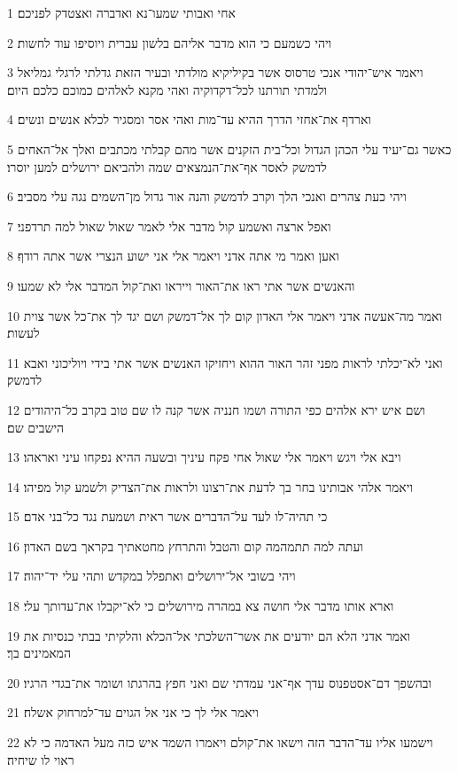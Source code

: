 \par 1 אחי ואבותי שמעו־נא ואדברה ואצטדק לפניכם׃
\par 2 ויהי כשמעם כי הוא מדבר אליהם בלשון עברית ויוסיפו עוד לחשות׃
\par 3 ויאמר איש־יהודי אנכי טרסוס אשר בקיליקיא מולדתי ובעיר הזאת גדלתי לרגלי גמליאל ולמדתי תורתנו לכל־דקדוקיה ואהי מקנא לאלהים כמוכם כלכם היום׃
\par 4 וארדף את־אחזי הדרך ההיא עד־מות ואהי אסר ומסגיר לכלא אנשים ונשים׃
\par 5 כאשר גם־יעיד עלי הכהן הגדול וכל־בית הזקנים אשר מהם קבלתי מכתבים ואלך אל־האחים לדמשק לאסר אף־את־הנמצאים שמה ולהביאם ירושלים למען יוסרו׃
\par 6 ויהי כעת צהרים ואנכי הלך וקרב לדמשק והנה אור גדול מן־השמים נגה עלי מסביב׃
\par 7 ואפל ארצה ואשמע קול מדבר אלי לאמר שאול שאול למה תרדפני׃
\par 8 ואען ואמר מי אתה אדני ויאמר אלי אני ישוע הנצרי אשר אתה רודף׃
\par 9 והאנשים אשר אתי ראו את־האור וייראו ואת־קול המדבר אלי לא שמעו׃
\par 10 ואמר מה־אעשה אדני ויאמר אלי האדון קום לך אל־דמשק ושם יגד לך את־כל אשר צוית לעשות׃
\par 11 ואני לא־יכלתי לראות מפני זהר האור ההוא ויחזיקו האנשים אשר אתי בידי ויוליכוני ואבא לדמשק׃
\par 12 ושם איש ירא אלהים כפי התורה ושמו חנניה אשר קנה לו שם טוב בקרב כל־היהודים הישבים שם׃
\par 13 ויבא אלי ויגש ויאמר אלי שאול אחי פקח עיניך ובשעה ההיא נפקחו עיני ואראהו׃
\par 14 ויאמר אלהי אבותינו בחר בך לדעת את־רצונו ולראות את־הצדיק ולשמע קול מפיהו׃
\par 15 כי תהיה־לו לעד על־הדברים אשר ראית ושמעת נגד כל־בני אדם׃
\par 16 ועתה למה תתמהמה קום והטבל והתרחץ מחטאתיך בקראך בשם האדון׃
\par 17 ויהי בשובי אל־ירושלים ואתפלל במקדש ותהי עלי יד־יהוה׃
\par 18 וארא אותו מדבר אלי חושה צא במהרה מירושלים כי לא־יקבלו את־עדותך עלי׃
\par 19 ואמר אדני הלא הם יודעים את אשר־השלכתי אל־הכלא והלקיתי בבתי כנסיות את המאמינים בך׃
\par 20 ובהשפך דם־אסטפנוס עדך אף־אני עמדתי שם ואני חפץ בהרגתו ושומר את־בגדי הרגיו׃
\par 21 ויאמר אלי לך כי אני אל הגוים עד־למרחוק אשלח׃
\par 22 וישמעו אליו עד־הדבר הזה וישאו את־קולם ויאמרו השמד איש כזה מעל האדמה כי לא ראוי לו שיחיה׃

